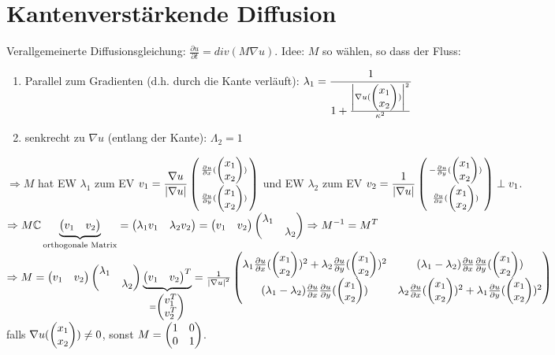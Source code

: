 \section{Kantenverstärkende Diffusion}
    Verallgemeinerte Diffusionsgleichung: $\displaystyle \frac{\partial u}{\partial t} = div(M \nabla u)$.
    Idee: $M$ so wählen, so dass der Fluss:
    \begin{enumerate}[label=-]
        \item Parallel zum Gradienten (d.h. durch die Kante verläuft): $\displaystyle \lambda_1=\frac{1}{1+\frac{\abs{\nabla u (\x)}^2}{\kappa^2}}$
        \item senkrecht zu $\nabla u$ (entlang der Kante): $\Lambda_2=1$
    \end{enumerate}

    $\Rightarrow M$ hat EW $\lambda_1$ zum EV $\displaystyle v_1= \frac{\nabla u}{\abs{\nabla u}}\srmatrix{\frac{\partial u}{\partial x}(\x)\\\frac{\partial u}{\partial y}(\x)}$ und EW $\lambda_2$ zum EV $\displaystyle v_2 = \frac{1}{\abs{\nabla u}} \srmatrix{-\frac{\partial u}{\partial y}(\x)\\\frac{\partial u}{\partial x}(\x)} \perp v_1$.\\
    $\displaystyle \Rightarrow M \C \underbrace{\mat{v_1 & v_2}}_{\small \text{orthogonale Matrix}} = \mat{\lambda_1 v_1 & \lambda_2 v_2} = \mat{v_1 & v_2} \mat{\lambda_1 & \ \\ \ & \lambda_2} \Rightarrow M^{-1} = M^T$\\
    $\Rightarrow M= \mat{v_1 & v_2} \mat{\lambda_1 & \ \\ \ & \lambda_2} \underbrace{\mat{v_1 & v_2}^T}_{=\mat{v_1^T \\ v_2^T}} = \frac{1}{\abs{\nabla u}^2} \mat{\lambda_1 \frac{\partial u}{\partial x}(\x)^2 + \lambda_2 \frac{\partial u}{\partial y}(\x)^2  & (\lambda_1 - \lambda_2)\frac{\partial u}{\partial x} \frac{\partial u}{\partial y}(\x)\\ (\lambda_1 - \lambda_2)\frac{\partial u}{\partial x} \frac{\partial u}{\partial y}(\x) & \lambda_2 \frac{\partial u}{\partial x}(\x)^2 + \lambda_1 \frac{\partial u}{\partial y}(\x)^2}$\\
    falls $\nabla u(\x) \neq 0$, sonst $M= \mat{1 & 0 \\ 0 & 1}$.

